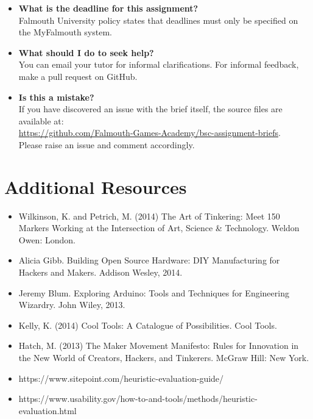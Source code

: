 \documentclass{../fal_assignment}
\begin{document}
\begin{itemize}
	\item 	\textbf{What is the deadline for this assignment?} \\ 
    		Falmouth University policy states that deadlines must only be specified on the MyFalmouth system.
    		
	\item 	\textbf{What should I do to seek help?} \\ 
    		You can email your tutor for informal clarifications. For informal feedback, make a pull request on GitHub. 
    		
    	\item 	\textbf{Is this a mistake?} \\ 	
    		If you have discovered an issue with the brief itself, the source files are available at: \\
    		\url{https://github.com/Falmouth-Games-Academy/bsc-assignment-briefs}.\\
    		 Please raise an issue and comment accordingly.
\end{itemize}

\section*{Additional Resources}

\begin{itemize}
     \item Wilkinson, K. and Petrich, M. (2014) The Art of Tinkering: Meet 150 Markers Working at the Intersection of Art, Science \& Technology. Weldon Owen: London.
    \item Alicia Gibb. Building Open Source Hardware: DIY Manufacturing for Hackers and Makers. Addison Wesley, 2014. 
    \item Jeremy Blum. Exploring Arduino: Tools and Techniques for Engineering Wizardry. John Wiley, 2013. 
    \item Kelly, K. (2014) Cool Tools: A Catalogue of Possibilities. Cool Tools.
    \item Hatch, M. (2013) The Maker Movement Manifesto: Rules for Innovation in the New World of Creators, Hackers, and Tinkerers. McGraw Hill: New York.
    \item https://www.sitepoint.com/heuristic-evaluation-guide/
    \item https://www.usability.gov/how-to-and-tools/methods/heuristic-evaluation.html
    
\end{itemize}
\end{document}
